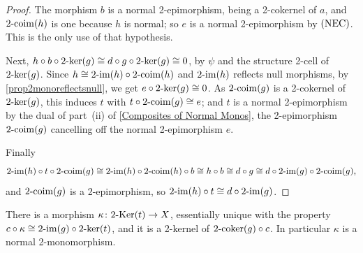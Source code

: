 \begin{proof}
  \leanok
  The morphism \(b\) is a normal 2-epimorphism, being a 2-cokernel of \(a\), and \(2\text{-}\mathrm{coim}(h)\) is one because \(h\) is normal; so \(e\) is a normal 2-epimorphism by \(\textup{(NEC)}\). This is the only use of that hypothesis.

	Next, \(h\circ b\circ2\text{-}\mathrm{ker}(g)\cong d\circ g\circ2\text{-}\mathrm{ker}(g)\cong 0\), by \(\psi\) and the structure 2-cell of \(2\text{-}\mathrm{ker}(g)\). Since \(h\cong2\text{-}\mathrm{im}(h)\circ2\text{-}\mathrm{coim}(h)\) and \(2\text{-}\mathrm{im}(h)\) reflects null morphisms, by \prox\ref{prop2monoreflectsnull}, we get \(e\circ2\text{-}\mathrm{ker}(g)\cong 0\). As \(2\text{-}\mathrm{coim}(g)\) is a 2-cokernel of \(2\text{-}\mathrm{ker}(g)\), this induces \(t\) with \(t\circ2\text{-}\mathrm{coim}(g)\cong e\); and \(t\) is a normal 2-epimorphism by the dual of part~\textup{(ii)} of \prox\ref{Composites of Normal Monos}, the 2-epimorphism \(2\text{-}\mathrm{coim}(g)\) cancelling off the normal 2-epimorphism \(e\).

	Finally
	\[
		2\text{-}\mathrm{im}(h)\circ t\circ2\text{-}\mathrm{coim}(g)\cong2\text{-}\mathrm{im}(h)\circ2\text{-}\mathrm{coim}(h)\circ b\cong h\circ b\cong d\circ g\cong d\circ2\text{-}\mathrm{im}(g)\circ2\text{-}\mathrm{coim}(g)\text{,}
	\]
	and \(2\text{-}\mathrm{coim}(g)\) is a 2-epimorphism, so \(2\text{-}\mathrm{im}(h)\circ t\cong d\circ2\text{-}\mathrm{im}(g)\).
\end{proof}

\begin{proposition}
  \label{P:NSDKappa}   \leanok
  There is a morphism \(\kappa\colon2\text{-}\mathrm{Ker}(t)\to X\), essentially unique with the property \(c\circ\kappa\cong2\text{-}\mathrm{im}(g)\circ2\text{-}\mathrm{ker}(t)\), and it is a 2-kernel of \(2\text{-}\mathrm{coker}(g)\circ c\). In particular \(\kappa\) is a normal 2-monomorphism.
\end{proposition}

